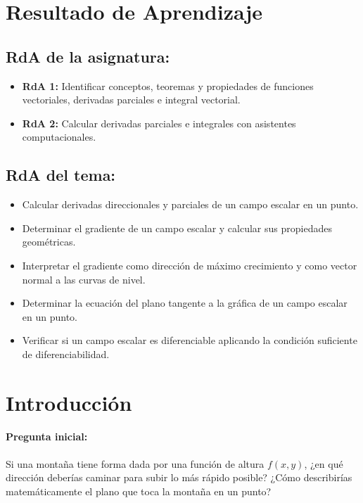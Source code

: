 \documentclass[a4,11pt]{aleph-notas}
\begin{document}
\encabezado

\section*{Resultado de Aprendizaje}

\subsection*{RdA de la asignatura:}
\begin{itemize}[leftmargin=*]
    \item \textbf{RdA 1:} Identificar conceptos, teoremas y propiedades de funciones vectoriales, derivadas parciales e integral vectorial.
    \item \textbf{RdA 2:} Calcular derivadas parciales e integrales con asistentes computacionales.
\end{itemize}

\subsection*{RdA del tema:}
\begin{itemize}[leftmargin=*]
    \item Calcular derivadas direccionales y parciales de un campo escalar en un punto.
    \item Determinar el gradiente de un campo escalar y calcular sus propiedades geométricas.
    \item Interpretar el gradiente como dirección de máximo crecimiento y como vector normal a las curvas de nivel.
    \item Determinar la ecuación del plano tangente a la gráfica de un campo escalar en un punto.
    \item Verificar si un campo escalar es diferenciable aplicando la condición suficiente de diferenciabilidad.
\end{itemize}

\section*{Introducción}

\paragraph{Pregunta inicial:}
Si una montaña tiene forma dada por una función de altura $f(x,y)$, ¿en qué dirección deberías caminar para subir lo más rápido posible? ¿Cómo describirías matemáticamente el plano que toca la montaña en un punto?
\end{document}
